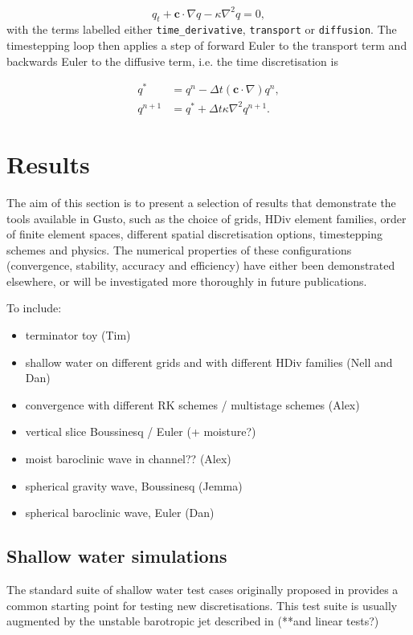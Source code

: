 \documentclass[journal abbreviation, manuscript]{copernicus}
\def\MM#1{\boldsymbol{#1}}
\begin{document}
\begin{equation}
  q_t + \MM{c}\cdot\nabla q - \kappa\nabla^2 q = 0,
\end{equation}
with the terms labelled either \texttt{time\_derivative},
\texttt{transport} or \texttt{diffusion}. The timestepping loop then
applies a step of forward Euler to the transport term and backwards
Euler to the diffusive term, i.e. the time discretisation is

\begin{align}
  q^* &= q^n - \Delta t (\MM{c}\cdot\nabla) q^n, \\
  q^{n+1} &= q^* + \Delta t \kappa \nabla^2 q^{n+1}.
\end{align}



\section{Results}
\label{sec: results}
The aim of this section is to present a selection of results that
demonstrate the tools available in Gusto, such as the choice of grids,
HDiv element families, order of finite element spaces, different
spatial discretisation options, timestepping schemes and physics. The
numerical properties of these configurations (convergence, stability,
accuracy and efficiency) have either been demonstrated elsewhere, or
will be investigated more thoroughly in future publications.

To include:
\begin{itemize}
\item terminator toy (Tim)
\item shallow water on different grids and with different HDiv families (Nell and Dan)
\item convergence with different RK schemes / multistage schemes (Alex)
\item vertical slice Boussinesq / Euler (+ moisture?)
\item moist baroclinic wave in channel?? (Alex)
\item spherical gravity wave, Boussinesq (Jemma)
\item spherical baroclinic wave, Euler (Dan)
\end{itemize}

\subsection{Shallow water simulations}
The standard suite of shallow water test cases originally proposed in
\citet{williamson1992standard} provides a common starting point for
testing new discretisations. This test suite is usually augmented by
the unstable barotropic jet described in \citet{galewsky2004initial}
(**and linear tests?)
\end{document}
